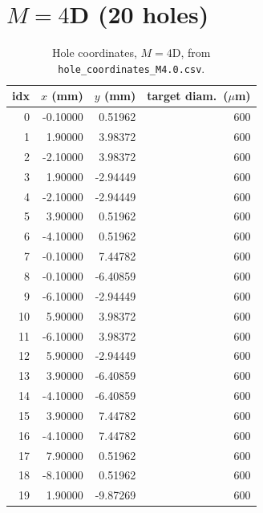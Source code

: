 \section{$M=4$D (20 holes)}
\begin{longtable}{rrrr}
\caption{Hole coordinates, $M=4$D, from \texttt{hole\_coordinates\_M4.0.csv}.}\\
\toprule
idx & $x$ (mm) & $y$ (mm) & target diam.\ ($\mu$m) \\
\midrule
\endhead
0 & -0.10000 & 0.51962 & 600 \\
1 & 1.90000 & 3.98372 & 600 \\
2 & -2.10000 & 3.98372 & 600 \\
3 & 1.90000 & -2.94449 & 600 \\
4 & -2.10000 & -2.94449 & 600 \\
5 & 3.90000 & 0.51962 & 600 \\
6 & -4.10000 & 0.51962 & 600 \\
7 & -0.10000 & 7.44782 & 600 \\
8 & -0.10000 & -6.40859 & 600 \\
9 & -6.10000 & -2.94449 & 600 \\
10 & 5.90000 & 3.98372 & 600 \\
11 & -6.10000 & 3.98372 & 600 \\
12 & 5.90000 & -2.94449 & 600 \\
13 & 3.90000 & -6.40859 & 600 \\
14 & -4.10000 & -6.40859 & 600 \\
15 & 3.90000 & 7.44782 & 600 \\
16 & -4.10000 & 7.44782 & 600 \\
17 & 7.90000 & 0.51962 & 600 \\
18 & -8.10000 & 0.51962 & 600 \\
19 & 1.90000 & -9.87269 & 600 \\
\bottomrule
\end{longtable}

